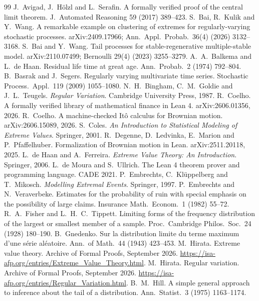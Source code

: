\documentclass[11pt]{article}
\begin{document}
\begin{thebibliography}{99}
 J.~Avigad, J.~H\"olzl and L.~Serafin. A formally verified proof of the central limit theorem. J.\ Automated Reasoning 59 (2017) 389--423.
 S.~Bai, R.~Kulik and Y.~Wang. A remarkable example on clustering of extremes for regularly-varying stochastic processes. arXiv:2409.17966; Ann.\ Appl.\ Probab.\ 36(4) (2026) 3132--3168.
 S.~Bai and Y.~Wang. Tail processes for stable-regenerative multiple-stable model. arXiv:2110.07499; Bernoulli 29(4) (2023) 3255--3279.
 A.~A.~Balkema and L.~de Haan. Residual life time at great age. Ann.\ Probab.\ 2 (1974) 792--804.
 B.~Basrak and J.~Segers. Regularly varying multivariate time series. Stochastic Process.\ Appl.\ 119 (2009) 1055--1080.
 N.~H.~Bingham, C.~M.~Goldie and J.~L.~Teugels. \emph{Regular Variation}. Cambridge University Press, 1987.
 R.~Coelho. A formally verified library of mathematical finance in Lean 4. arXiv:2606.01356, 2026.
 R.~Coelho. A machine-checked It\^o calculus for Brownian motion. arXiv:2606.15089, 2026.
 S.~Coles. \emph{An Introduction to Statistical Modeling of Extreme Values}. Springer, 2001.
 R.~Degenne, D.~Ledvinka, E.~Marion and P.~Pfaffelhuber. Formalization of Brownian motion in Lean. arXiv:2511.20118, 2025.
 L.~de Haan and A.~Ferreira. \emph{Extreme Value Theory: An Introduction}. Springer, 2006.
 L.~de Moura and S.~Ullrich. The Lean 4 theorem prover and programming language. CADE 2021.
 P.~Embrechts, C.~Kl\"uppelberg and T.~Mikosch. \emph{Modelling Extremal Events}. Springer, 1997.
 P.~Embrechts and N.~Veraverbeke. Estimates for the probability of ruin with special emphasis on the possibility of large claims. Insurance Math.\ Econom.\ 1 (1982) 55--72.
 R.~A.~Fisher and L.~H.~C.~Tippett. Limiting forms of the frequency distribution of the largest or smallest member of a sample. Proc.\ Cambridge Philos.\ Soc.\ 24 (1928) 180--190.
 B.~Gnedenko. Sur la distribution limite du terme maximum d'une s\'erie al\'eatoire. Ann.\ of Math.\ 44 (1943) 423--453.
 M.~Hirata. Extreme value theory. Archive of Formal Proofs, September 2026. \url{https://isa-afp.org/entries/Extreme_Value_Theory.html}.
 M.~Hirata. Regular variation. Archive of Formal Proofs, September 2026. \url{https://isa-afp.org/entries/Regular_Variation.html}.
 B.~M.~Hill. A simple general approach to inference about the tail of a distribution. Ann.\ Statist.\ 3 (1975) 1163--1174.

\end{thebibliography}
\end{document}
